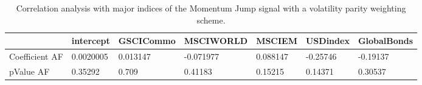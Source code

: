 \begin{table}[H]
\centering
\begin{tabular}{lllllll}
& intercept & GSCICommo & MSCIWORLD & MSCIEM & USDindex & GlobalBonds \\ 
\hline 
Coefficient AF & 0.0020005 & 0.013147 & -0.071977 & 0.088147 & -0.25746 & -0.19137 \\ 
pValue AF & 0.35292 & 0.709 & 0.41183 & 0.15215 & 0.14371 & 0.30537 \\ 
\hline
\end{tabular}
\caption{Correlation analysis with major indices of the Momentum Jump signal with a volatility parity weighting scheme.}
\label{MOMJUMPVP_AFACTOR}
\end{table}